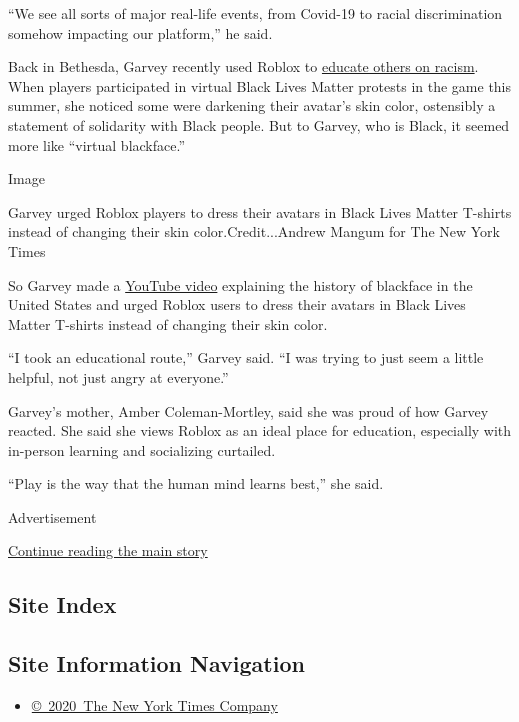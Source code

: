 ``We see all sorts of major real-life events, from Covid-19 to racial
discrimination somehow impacting our platform,'' he said.

Back in Bethesda, Garvey recently used Roblox to
\href{https://www.nytimes3xbfgragh.onion/2020/06/24/well/family/how-to-raise-an-anti-racist-kid.html}{educate
others on racism}. When players participated in virtual Black Lives
Matter protests in the game this summer, she noticed some were darkening
their avatar's skin color, ostensibly a statement of solidarity with
Black people. But to Garvey, who is Black, it seemed more like ``virtual
blackface.''

Image

Garvey urged Roblox players to dress their avatars in Black Lives Matter
T-shirts instead of changing their skin color.Credit...Andrew Mangum for
The New York Times

So Garvey made a
\href{https://www.youtube.com/watch?time_continue=2\&v=BfO_ZK0Kvj8\&feature=emb_logo}{YouTube
video} explaining the history of blackface in the United States and
urged Roblox users to dress their avatars in Black Lives Matter T-shirts
instead of changing their skin color.

``I took an educational route,'' Garvey said. ``I was trying to just
seem a little helpful, not just angry at everyone.''

Garvey's mother, Amber Coleman-Mortley, said she was proud of how Garvey
reacted. She said she views Roblox as an ideal place for education,
especially with in-person learning and socializing curtailed.

``Play is the way that the human mind learns best,'' she said.

Advertisement

\protect\hyperlink{after-bottom}{Continue reading the main story}

\hypertarget{site-index}{%
\subsection{Site Index}\label{site-index}}

\hypertarget{site-information-navigation}{%
\subsection{Site Information
Navigation}\label{site-information-navigation}}

\begin{itemize}
\tightlist
\item
  \href{https://help.nytimes3xbfgragh.onion/hc/en-us/articles/115014792127-Copyright-notice}{©~2020~The
  New York Times Company}
\end{itemize}

